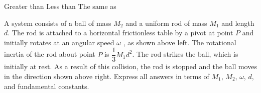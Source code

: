\documentclass{../../oss-apphys-exam}
\begin{document}
\begin{questions}
\begin{parts}
    \vspace{.1in}   
    \underline{\hspace{.3in}} Greater than\hspace{.2in}
    \underline{\hspace{.3in}} Less than\hspace{.2in}
    \underline{\hspace{.3in}} The same as
  \end{parts}
  \newpage

  \question A system consists of a ball of mass $M_2$ and a uniform rod of mass
  $M_1$ and length $d$. The rod is attached to a horizontal frictionless table
  by a pivot at point $P$ and initially rotates at an angular speed $\omega$ ,
  as shown above left. The rotational inertia of the rod about point $P$ is
  $\dfrac13M_1d^2$. The rod strikes the ball, which is initially at rest. As a
  result of this collision, the rod is stopped and the ball moves in the
  direction shown above right. Express all answers in terms of $M_1$, $M_2$,
  $\omega$, $d$, and fundamental constants.
\end{questions}
\end{document}

